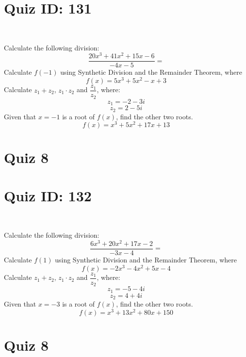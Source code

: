 \documentclass{exam}
\begin{document}
\section*{Quiz ID: 131}
\vspace{0.5cm}\
\vspace{1cm}\
\begin{questions}
\question Calculate the following division:\[\dfrac{
20x^3 + 41x^2 + 15x - 6}{
-4x - 5}=\] \makeemptybox{\stretch{2}}
\question Calculate $f(-1)$ using Synthetic Division and the Remainder Theorem, where\[f(x) = 
5x^3 + 5x^2 - x + 3\]
\newpage\question Calculate $z_1+z_2$, $z_1\cdot z_2$ and $\dfrac{z_1}{z_2}$, where:\[z_1=-2-3\mathit{i}\]\[z_2=2-5\mathit{i}\]
\question Given that $x=-1$ is a root of $f(x)$, find the other two roots.\[f(x)=
x^3 + 5x^2 + 17x + 13\]\makeemptybox{\stretch{1}}
\end{questions}\newpage
\newpage
\section*{Quiz 8}
\section*{Quiz ID: 132}
\vspace{0.5cm}\
\vspace{1cm}\
\begin{questions}
\question Calculate the following division:\[\dfrac{
6x^3 + 20x^2 + 17x - 2}{
-3x - 4}=\] 
\question Calculate $f(1)$ using Synthetic Division and the Remainder Theorem, where\[f(x) = 
-2x^3 - 4x^2 + 5x - 4\]
\newpage\question Calculate $z_1+z_2$, $z_1\cdot z_2$ and $\dfrac{z_1}{z_2}$, where:\[z_1=-5-4\mathit{i}\]\[z_2=4+4\mathit{i}\]\makeemptybox{\stretch{1}}
\question Given that $x=-3$ is a root of $f(x)$, find the other two roots.\[f(x)=
x^3 + 13x^2 + 80x + 150\]\makeemptybox{\stretch{1}}
\end{questions}\newpage
\newpage
\section*{Quiz 8}
\end{document}
